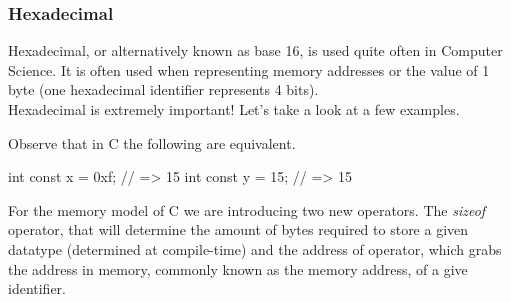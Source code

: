 \clearpage
{}


\subsubsection*{Hexadecimal}


Hexadecimal, or alternatively known as base 16, is used quite often in Computer Science. It is often used when representing memory addresses or the value of 1 byte (one hexadecimal identifier represents 4 bits).\\

Hexadecimal is extremely important! Let's take a look at a few examples.\\




Observe that in C the following are equivalent.\\

\begin{code}[c]
int const x = 0xf; // => 15
int const y = 15; // => 15
\end{code}


For the memory model of C we are introducing two new operators. The \emph{sizeof} operator, that will determine the amount of bytes required to store a given datatype (determined at compile-time) and the address of operator, which grabs the address in memory, commonly known as the memory address, of a give identifier.\\

